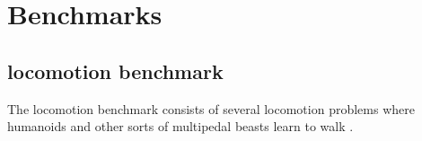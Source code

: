 \chapter{Benchmarks}

\section{\mujoco locomotion benchmark}

The \mujoco locomotion benchmark consists of several locomotion problems where humanoids and other sorts of multipedal beasts learn to walk \cite{mujoco}.

